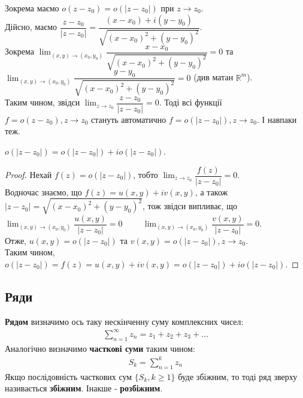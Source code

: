 \documentclass{math_library}
\begin{document}
\begin{example}
Зокрема маємо $o(z-z_0) = o(|z-z_0|)$ при $z \to z_0$.\\
Дійсно, маємо $\dfrac{z-z_0}{|z-z_0|} = \dfrac{(x-x_0) + i(y-y_0)}{\sqrt{(x-x_0)^2 + (y-y_0)^2}}$.\\
Зокрема $\displaystyle\lim_{(x,y) \to (x_0,y_0)} \dfrac{x-x_0}{\sqrt{(x-x_0)^2 + (y-y_0)^2}} = 0$ та $\displaystyle\lim_{(x,y) \to (x_0,y_0)} \dfrac{y-y_0}{\sqrt{(x-x_0)^2 + (y-y_0)^2}} = 0$ (див матан $\mathbb{R}^m$).\\
Таким чином, звідси $\displaystyle\lim_{z \to z_0} \dfrac{z-z_0}{|z-z_0|} = 0$. Тоді всі функції $f = o(z-z_0), z \to z_0$ стануть автоматично $f = o(|z-z_0|), z \to z_0$. І навпаки теж.
\end{example}

\begin{proposition}
$o(|z-z_0|) = o(|z-z_0|) + io(|z-z_0|)$.
\end{proposition}

\begin{proof}
Нехай $f(z) = o(|z-z_0|)$, тобто $\displaystyle\lim_{z \to z_0} \dfrac{f(z)}{|z-z_0|} = 0$.\\
Водночас знаємо, що $f(z) = u(x,y) + iv(x,y)$, а також $|z-z_0| = \sqrt{(x-x_0)^2+ (y-y_0)^2}$, тож звідси випливає, що\\
$\displaystyle\lim_{(x,y) \to (x_0,y_0)} \dfrac{u(x,y)}{|z-z_0|} = 0 \hspace{1cm} \lim_{(x,y) \to (x_0,y_0)} \dfrac{v(x,y)}{|z-z_0|} = 0$.\\
Отже, $u(x,y) = o(|z-z_0|)$ та $v(x,y) = o(|z-z_0|), z \to z_0$.\\
Таким чином, $o(|z-z_0|) = f(z) = u(x,y) + iv(x,y) = o(|z-z_0|) + io(|z-z_0|)$.
\end{proof}

\subsection{Ряди}
\begin{definition}
\textbf{Рядом} визначимо ось таку нескінченну суму комплексних чисел:\\
\begin{align*}
\sum_{n=1}^\infty z_n = z_1 + z_2 + z_3 + \dots
\end{align*}
Аналогічно визначимо \textbf{часткові суми} таким чином:
\begin{align*}
S_k = \sum_{n=1}^k z_n
\end{align*}
Якщо послідовність часткових сум $\{S_k, k \geq 1\}$ буде збіжним, то тоді ряд зверху називається \textbf{збіжним}. Інакше - \textbf{розбіжним}.
\end{definition}
\end{document}
